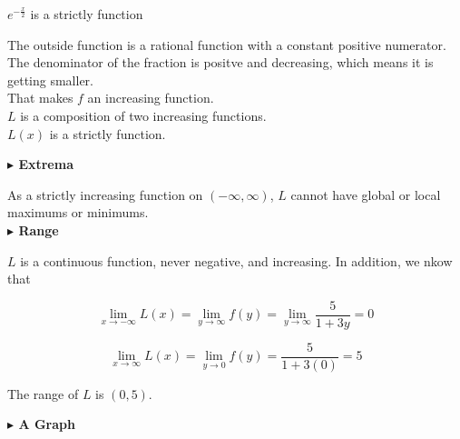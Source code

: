\documentclass{ximera}
\begin{document}
\begin{example}
$e^{-\tfrac{x}{2}}$ is a strictly   function 


The outside function is a rational function with a constant positive numerator. \\

The denominator of the fraction is positve and decreasing, which means it is getting smaller. \\

That makes $f$ an increasing function. \\


$L$ is a composition of two increasing functions. \\


$L(x)$ is a strictly   function.






\textbf{\textcolor{blue!55!black}{$\blacktriangleright$ Extrema}} 


As a strictly increasing function on $(-\infty, \infty)$, $L$ cannot have global or local maximums or minimums. \\










\textbf{\textcolor{blue!55!black}{$\blacktriangleright$ Range}} 



$L$ is a continuous function, never negative, and increasing. In addition, we nkow that 





\[  
\lim\limits_{x \to -\infty}L(x) = \lim\limits_{y \to \infty}f(y) = \lim\limits_{y \to \infty}\frac{5}{1 + 3 y} = 0
\]




\[  
\lim\limits_{x \to \infty}L(x) = \lim\limits_{y \to 0}f(y) = \frac{5}{1 + 3 (0)} = 5
\]








The range of $L$ is $(0, 5)$.













\textbf{\textcolor{blue!55!black}{$\blacktriangleright$ A Graph}} 






\end{example}
\end{document}
